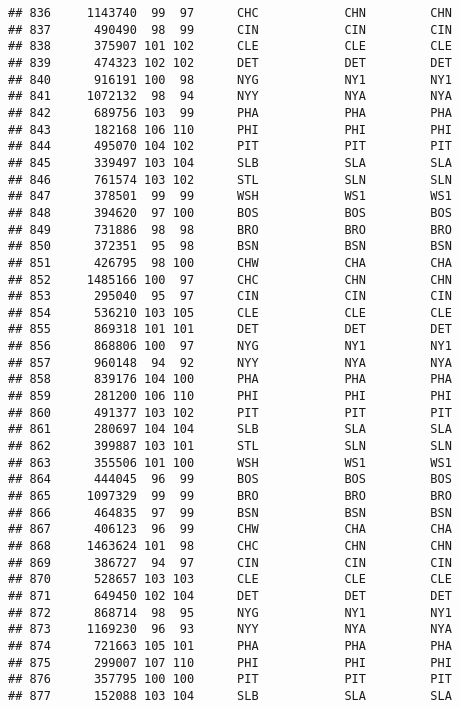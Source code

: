 \documentclass[]{article}
\begin{document}
\begin{verbatim}
## 836     1143740  99  97      CHC            CHN         CHN
## 837      490490  98  99      CIN            CIN         CIN
## 838      375907 101 102      CLE            CLE         CLE
## 839      474323 102 102      DET            DET         DET
## 840      916191 100  98      NYG            NY1         NY1
## 841     1072132  98  94      NYY            NYA         NYA
## 842      689756 103  99      PHA            PHA         PHA
## 843      182168 106 110      PHI            PHI         PHI
## 844      495070 104 102      PIT            PIT         PIT
## 845      339497 103 104      SLB            SLA         SLA
## 846      761574 103 102      STL            SLN         SLN
## 847      378501  99  99      WSH            WS1         WS1
## 848      394620  97 100      BOS            BOS         BOS
## 849      731886  98  98      BRO            BRO         BRO
## 850      372351  95  98      BSN            BSN         BSN
## 851      426795  98 100      CHW            CHA         CHA
## 852     1485166 100  97      CHC            CHN         CHN
## 853      295040  95  97      CIN            CIN         CIN
## 854      536210 103 105      CLE            CLE         CLE
## 855      869318 101 101      DET            DET         DET
## 856      868806 100  97      NYG            NY1         NY1
## 857      960148  94  92      NYY            NYA         NYA
## 858      839176 104 100      PHA            PHA         PHA
## 859      281200 106 110      PHI            PHI         PHI
## 860      491377 103 102      PIT            PIT         PIT
## 861      280697 104 104      SLB            SLA         SLA
## 862      399887 103 101      STL            SLN         SLN
## 863      355506 101 100      WSH            WS1         WS1
## 864      444045  96  99      BOS            BOS         BOS
## 865     1097329  99  99      BRO            BRO         BRO
## 866      464835  97  99      BSN            BSN         BSN
## 867      406123  96  99      CHW            CHA         CHA
## 868     1463624 101  98      CHC            CHN         CHN
## 869      386727  94  97      CIN            CIN         CIN
## 870      528657 103 103      CLE            CLE         CLE
## 871      649450 102 104      DET            DET         DET
## 872      868714  98  95      NYG            NY1         NY1
## 873     1169230  96  93      NYY            NYA         NYA
## 874      721663 105 101      PHA            PHA         PHA
## 875      299007 107 110      PHI            PHI         PHI
## 876      357795 100 100      PIT            PIT         PIT
## 877      152088 103 104      SLB            SLA         SLA

\end{verbatim}
\end{document}

